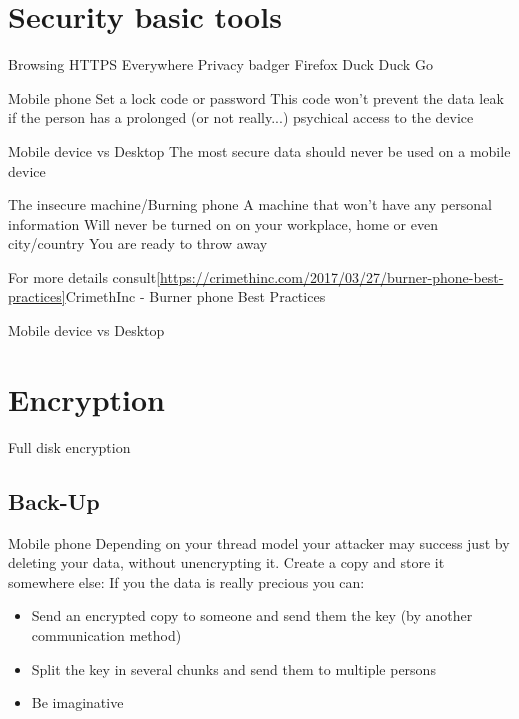 \documentclass[11pt]{beamer}
\begin{document}
\section{Security basic tools}
\begin{frame}{Browsing}
HTTPS Everywhere
Privacy badger
Firefox
Duck Duck Go 
\end{frame}
\begin{frame}{Mobile phone}
Set a lock code or password
This code won't prevent the data leak if the person has a prolonged (or not really...) psychical access to  the device
\end{frame}
\begin{frame}{Mobile device vs Desktop}
The most secure data should never be used on a mobile device
\end{frame}
\begin{frame}{The insecure machine/Burning phone}
A machine that won't have any personal information
Will never be turned on on your workplace, home  or  even city/country
You are ready to throw away

For more details consult\ref{https://crimethinc.com/2017/03/27/burner-phone-best-practices}{CrimethInc - Burner phone Best Practices}
\end{frame}
\begin{frame}{Mobile device vs Desktop}

\end{frame}
\section{Encryption}
Full disk encryption
\subsection{Back-Up}
\begin{frame}{Mobile phone}
Depending on your thread model your attacker may success just by deleting your data, without unencrypting it.
Create a copy and store it somewhere else:
If you the data is really precious you can:
\begin{itemize}
\item Send an encrypted copy to someone and send them the key (by another communication method)
\item Split the key in several chunks and send them to multiple  persons
\item Be imaginative
\end{itemize}
\end{frame}
\end{document}
